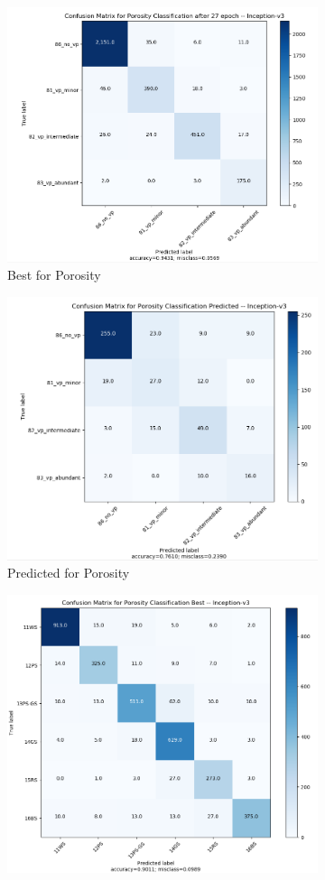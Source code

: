 \begin{figure}
\begin{subfigure}{.5\textwidth}
  \centering
  \includegraphics[width=.8\linewidth]{figures/04-go_baby_best.PNG}
  \caption{Best for Porosity}
  \label{fig:rescm_poro}
\end{subfigure}%
\begin{subfigure}{.5\textwidth}
  \centering
  \includegraphics[width=.8\linewidth]{figures/04-go_baby_pred.PNG}
  \caption{Predicted for Porosity}
  \label{fig:rescmpred_poro}
\end{subfigure}
\begin{subfigure}{.5\textwidth}
  \centering
  \includegraphics[width=.8\linewidth]{figures/04-go_dunham_best.PNG}

\end{subfigure}
\end{figure}
